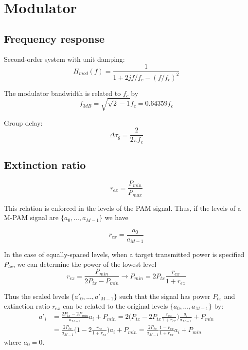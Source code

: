 \section{Modulator}
\subsection{Frequency response}

Second-order system with unit damping:
\begin{equation}
	H_{mod}(f) =  \frac{1}{1 + 2jf/f_c - (f/f_c)^2}
\end{equation}

The modulator bandwidth is related to $f_c$ by
\begin{equation}
f_{3dB} = \sqrt{\sqrt{2}-1}f_c = 0.64359f_c
\end{equation}

Group delay:
\begin{equation}
	\Delta\tau_g = \frac{2}{2\pi f_c}
\end{equation}


\subsection{Extinction ratio}
\begin{equation}
	r_{ex} = \frac{P_{min}}{P_{max}}
\end{equation}

This relation is enforced in the levels of the PAM signal. Thus, if the levels of a M-PAM signal are $\{a_0, \ldots, a_{M-1}\}$ we have

\begin{equation}
	r_{ex} = \frac{a_0}{a_{M-1}}
\end{equation}

In the case of equally-spaced levels, when a target transmitted power is specified $P_{tx}$, we can determine the power of the lowest level
\begin{equation}
	r_{ex} = \frac{P_{min}}{2P_{tx} - P_{min}} \rightarrow P_{min} = 2P_{tx}\frac{r_{ex}}{1 + r_{ex}}
\end{equation}

Thus the scaled levels $\{a'_0, \ldots, a'_{M-1}\}$ such that the signal has power $P_{tx}$ and extinction ratio $r_{ex}$ can be related to the original levels $\{a_0, \ldots, a_{M-1}\}$ by:
\begin{align} \nonumber
	a'_i &= \frac{2P_{tx} - 2P_{min}}{a_{M-1}}a_i + P_{min} = 2\bigg(P_{tx} - 2P_{tx}\frac{r_{ex}}{1 + r_{ex}}\bigg)\frac{a_i}{a_{M-1}} + P_{min} \\
	&= \frac{2P_{tx}}{a_{M-1}}\bigg(1 - 2\frac{r_{ex}}{1 + r_{ex}}\bigg)a_i + P_{min} = \frac{2P_{tx}}{a_{M-1}}\frac{1-r_{ex}}{1 + r_{ex}}a_i + P_{min} 
\end{align}
where $a_0 = 0$.

